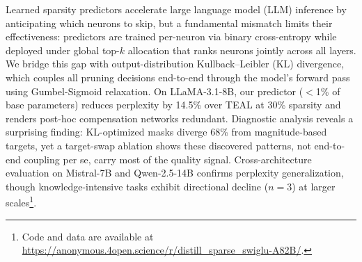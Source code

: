 Learned sparsity predictors accelerate large language model (LLM) inference by anticipating which neurons to skip, but a fundamental mismatch limits their effectiveness: predictors are trained per-neuron via binary cross-entropy while deployed under global top-$k$ allocation that ranks neurons jointly across all layers.
We bridge this gap with output-distribution Kullback--Leibler (KL) divergence, which couples all pruning decisions end-to-end through the model's forward pass using Gumbel-Sigmoid relaxation.
On LLaMA-3.1-8B, our predictor ($<$1\% of base parameters) reduces perplexity by 14.5\% over TEAL at 30\% sparsity and renders post-hoc compensation networks redundant.
Diagnostic analysis reveals a surprising finding: KL-optimized masks diverge 68\% from magnitude-based targets, yet a target-swap ablation shows these discovered patterns, not end-to-end coupling per se, carry most of the quality signal.
Cross-architecture evaluation on Mistral-7B and Qwen-2.5-14B confirms perplexity generalization, though knowledge-intensive tasks exhibit directional decline ($n{=}3$) at larger scales\footnote{Code and data are available at \url{https://anonymous.4open.science/r/distill_sparse_swiglu-A82B/}.}.

